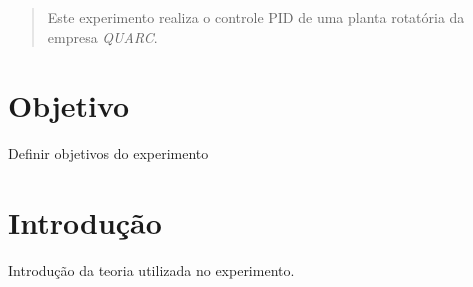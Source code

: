 \begin{abstract}
    Este experimento realiza o controle PID de uma planta rotatória da empresa \textit{QUARC}. 
\end{abstract}

\section*{Objetivo}
    Definir objetivos do experimento

\section{Introdução}
    \label{sec:intro}
    Introdução da teoria utilizada no experimento. \par